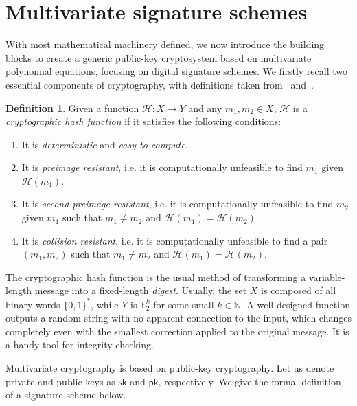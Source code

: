 \documentclass[12pt, a4paper, oneside]{memoir}
\theoremstyle{definition}
\newtheorem{definition}[theorem]{Definition}
\begin{document}
\section{Multivariate signature schemes}\label{sec:mult}

With most mathematical machinery defined, we now introduce the building blocks to create a generic public-key cryptosystem based on multivariate polynomial equations, focusing on digital signature schemes. We firstly recall two essential components of cryptography, with definitions taken from~\cite[Sec.~7.1]{Gathen:2015} and~\cite[Sec.~6.1]{Goldreich:2004}.

\begin{definition}
  Given a function $\mathcal{H} : X \to Y$ and any $m_{1}, m_{2} \in X$, $\mathcal{H}$ is a \emph{cryptographic hash function} if it satisfies the following conditions:

  \begin{enumerate}
    \item It is \emph{deterministic} and \emph{easy to compute}.
    \item It is \emph{preimage resistant}, i.e. it is computationally unfeasible to find $m_{1}$ given $\mathcal{H}(m_{1})$.
    \item It is \emph{second preimage resistant}, i.e. it is computationally unfeasible to find $m_{2}$ given $m_{1}$ such that $m_{1} \neq m_{2}$ and $\mathcal{H}(m_{1}) = \mathcal{H}(m_{2})$.
    \item It is \emph{collision resistant}, i.e. it is computationally unfeasible to find a pair $(m_{1}, m_{2})$ such that $m_{1} \neq m_{2}$ and $\mathcal{H}(m_{1}) = \mathcal{H}(m_{2})$.
  \end{enumerate}
\end{definition}

The cryptographic hash function is the usual method of transforming a variable-length message into a fixed-length \emph{digest}. Usually, the set $X$ is composed of all binary words $\{0, 1\}^{*}$, while $Y$ is $\mathbb{F}_{2}^{k}$ for some small $k \in \mathbb{N}$. A well-designed function outputs a random string with no apparent connection to the input, which changes completely even with the smallest correction applied to the original message. It is a handy tool for integrity checking.

Multivariate cryptography is based on public-key cryptography. Let us denote private and public keys as $\mathsf{sk}$ and $\mathsf{pk}$, respectively. We give the formal definition of a signature scheme below.
\end{document}
